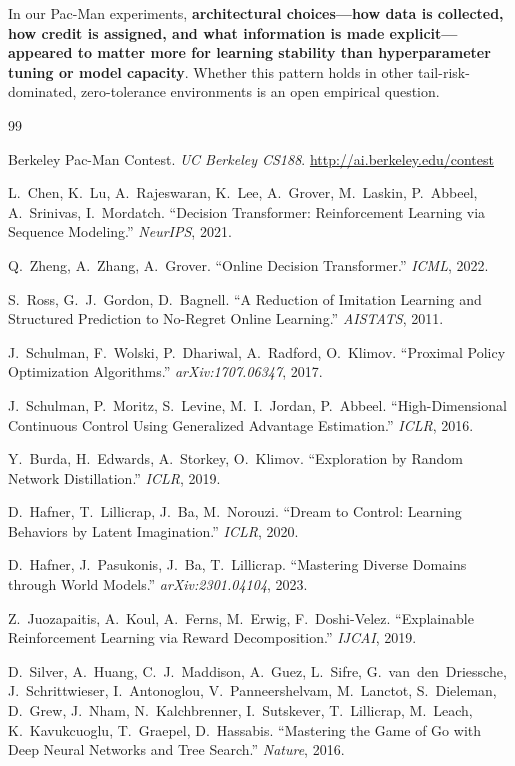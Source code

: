\documentclass[11pt,a4paper]{article}
\theoremstyle{definition}
\begin{document}
In our Pac-Man experiments, \textbf{architectural choices---how data is collected, how credit is assigned, and what information is made explicit---appeared to matter more for learning stability than hyperparameter tuning or model capacity}.
Whether this pattern holds in other tail-risk-dominated, zero-tolerance environments is an open empirical question.

\begin{thebibliography}{99}

Berkeley Pac-Man Contest. \textit{UC Berkeley CS188}. \url{http://ai.berkeley.edu/contest}

L.~Chen, K.~Lu, A.~Rajeswaran, K.~Lee, A.~Grover, M.~Laskin, P.~Abbeel, A.~Srinivas, I.~Mordatch.
``Decision Transformer: Reinforcement Learning via Sequence Modeling.''
\textit{NeurIPS}, 2021.

Q.~Zheng, A.~Zhang, A.~Grover.
``Online Decision Transformer.''
\textit{ICML}, 2022.

S.~Ross, G.~J.~Gordon, D.~Bagnell.
``A Reduction of Imitation Learning and Structured Prediction to No-Regret Online Learning.''
\textit{AISTATS}, 2011.

J.~Schulman, F.~Wolski, P.~Dhariwal, A.~Radford, O.~Klimov.
``Proximal Policy Optimization Algorithms.''
\textit{arXiv:1707.06347}, 2017.

J.~Schulman, P.~Moritz, S.~Levine, M.~I.~Jordan, P.~Abbeel.
``High-Dimensional Continuous Control Using Generalized Advantage Estimation.''
\textit{ICLR}, 2016.

Y.~Burda, H.~Edwards, A.~Storkey, O.~Klimov.
``Exploration by Random Network Distillation.''
\textit{ICLR}, 2019.

D.~Hafner, T.~Lillicrap, J.~Ba, M.~Norouzi.
``Dream to Control: Learning Behaviors by Latent Imagination.''
\textit{ICLR}, 2020.

D.~Hafner, J.~Pasukonis, J.~Ba, T.~Lillicrap.
``Mastering Diverse Domains through World Models.''
\textit{arXiv:2301.04104}, 2023.

Z.~Juozapaitis, A.~Koul, A.~Ferns, M.~Erwig, F.~Doshi-Velez.
``Explainable Reinforcement Learning via Reward Decomposition.''
\textit{IJCAI}, 2019.

D.~Silver, A.~Huang, C.~J.~Maddison, A.~Guez, L.~Sifre, G.~van~den~Driessche, J.~Schrittwieser, I.~Antonoglou, V.~Panneershelvam, M.~Lanctot, S.~Dieleman, D.~Grew, J.~Nham, N.~Kalchbrenner, I.~Sutskever, T.~Lillicrap, M.~Leach, K.~Kavukcuoglu, T.~Graepel, D.~Hassabis.
``Mastering the Game of Go with Deep Neural Networks and Tree Search.''
\textit{Nature}, 2016.


\end{thebibliography}
\end{document}
